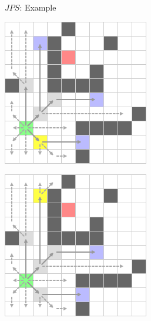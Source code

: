 \documentclass{presentation}
\begin{document}
\begin{frame}{$JPS$: Example}
\begin{minipage}{0.23\textwidth}
	\end{minipage}%
	\hfill%
	\begin{minipage}{0.23\textwidth}
		\includegraphics[width=\textwidth]{figures/jps_geschnitten/5.png}
	\end{minipage}%
	\hfill%
	\begin{minipage}{0.23\textwidth}
		\includegraphics[width=\textwidth]{figures/jps_geschnitten/6.png}

\end{minipage}
\end{frame}
\end{document}
